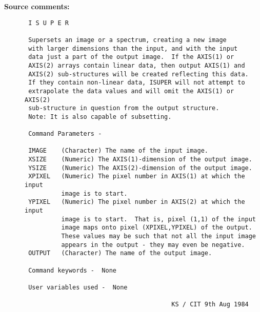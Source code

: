 \begin{description}
\item [{\bf Source comments:}]
\begin{verbatim}
 I S U P E R

 Supersets an image or a spectrum, creating a new image
 with larger dimensions than the input, and with the input
 data just a part of the output image.  If the AXIS(1) or
 AXIS(2) arrays contain linear data, then output AXIS(1) and
 AXIS(2) sub-structures will be created reflecting this data.
 If they contain non-linear data, ISUPER will not attempt to
 extrapolate the data values and will omit the AXIS(1) or AXIS(2)
 sub-structure in question from the output structure.
 Note: It is also capable of subsetting.

 Command Parameters -

 IMAGE    (Character) The name of the input image.
 XSIZE    (Numeric) The AXIS(1)-dimension of the output image.
 YSIZE    (Numeric) The AXIS(2)-dimension of the output image.
 XPIXEL   (Numeric) The pixel number in AXIS(1) at which the input
          image is to start.
 YPIXEL   (Numeric) The pixel number in AXIS(2) at which the input
          image is to start.  That is, pixel (1,1) of the input
          image maps onto pixel (XPIXEL,YPIXEL) of the output.
          These values may be such that not all the input image
          appears in the output - they may even be negative.
 OUTPUT   (Character) The name of the output image.

 Command keywords -  None

 User variables used -  None

                                        KS / CIT 9th Aug 1984
\end{verbatim}
\end{description}
